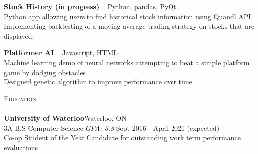 \documentclass[a4paper]{article}
\newcommand{\lineunder} {
    \vspace*{-8pt} \\
    \hspace*{-18pt} \hrulefill \\
}
\newcommand{\header} [1] {
    {\hspace*{-18pt}\vspace*{6pt} \textsc{#1}}
    \vspace*{-6pt} \lineunder
}
\begin{document}
{\textbf{Stock History (in progress)}} {\ \textbar{} Python, pandas, PyQt } \\
Python app allowing users to find historical stock information using Quandl API.\\
Implementing backtesting of a moving average trading strategy on stocks that are displayed.\\
\vspace*{2mm}

{\textbf{Platformer AI}} {\ \textbar{} Javascript, HTML} \\
Machine learning demo of neural networks attempting to beat a simple platform game by dodging obstacles.\\
Designed genetic algorithm to improve performance over time.\\
\vspace*{2mm}

\header{Education}
\textbf{University of Waterloo}\hfill Waterloo, ON\\
3A B.S Computer Science \textit{GPA: 3.8} \hfill Sept 2016 - April 2021 (expected)\\
Co-op Student of the Year Candidate for outstanding work term performance evaluations


\vspace{2mm}

\ 
\end{document}
